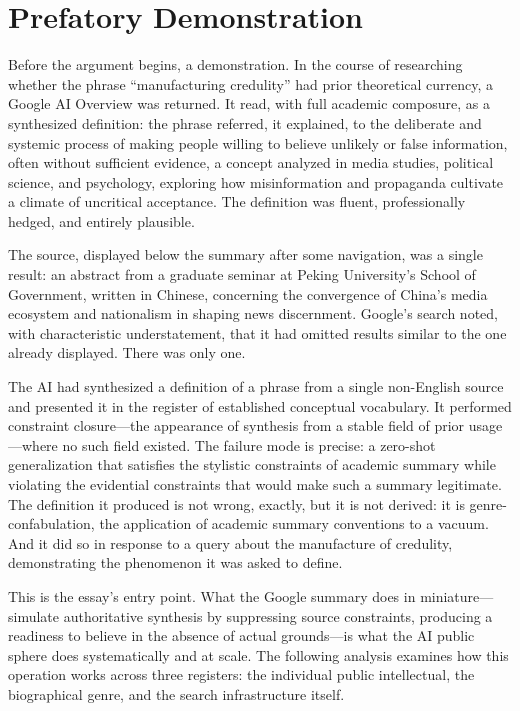 \documentclass[12pt, a4paper]{article}
\begin{document}
\newpage

\section{Prefatory Demonstration}

Before the argument begins, a demonstration. In the course of researching whether the phrase
``manufacturing credulity'' had prior theoretical currency, a Google AI Overview was returned. It
read, with full academic composure, as a synthesized definition: the phrase referred, it explained,
to the deliberate and systemic process of making people willing to believe unlikely or false
information, often without sufficient evidence, a concept analyzed in media studies, political
science, and psychology, exploring how misinformation and propaganda cultivate a climate of
uncritical acceptance. The definition was fluent, professionally hedged, and entirely plausible.

The source, displayed below the summary after some navigation, was a single result: an abstract
from a graduate seminar at Peking University's School of Government, written in Chinese, concerning
the convergence of China's media ecosystem and nationalism in shaping news discernment. Google's
search noted, with characteristic understatement, that it had omitted results similar to the one
already displayed. There was only one.

The AI had synthesized a definition of a phrase from a single non-English source and presented it
in the register of established conceptual vocabulary. It performed constraint closure---the
appearance of synthesis from a stable field of prior usage---where no such field existed. The
failure mode is precise: a zero-shot generalization that satisfies the stylistic constraints of
academic summary while violating the evidential constraints that would make such a summary
legitimate. The definition it produced is not wrong, exactly, but it is not derived: it is
genre-confabulation, the application of academic summary conventions to a vacuum. And it did so in
response to a query about the manufacture of credulity, demonstrating the phenomenon it was asked
to define.

This is the essay's entry point. What the Google summary does in miniature---simulate authoritative
synthesis by suppressing source constraints, producing a readiness to believe in the absence of
actual grounds---is what the AI public sphere does systematically and at scale. The following
analysis examines how this operation works across three registers: the individual public
intellectual, the biographical genre, and the search infrastructure itself.
\end{document}
